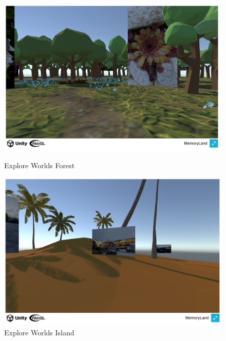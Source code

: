 \begin{figure} [h t]
    \centering
    \includegraphics[scale=0.5]{pics/explore_worlds_forest.PNG}
    \caption{Explore Worlds Forest}
    \label{fig:explore-worlds-forest}

    \vspace{1cm}
    
    \centering
    \includegraphics[scale=0.5]{pics/explore_worlds_island.PNG}
    \caption{Explore Worlds Island}
    \label{fig:explore-worlds-island}
\end{figure}





\clearpage










